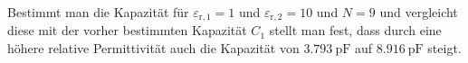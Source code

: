 Bestimmt man die Kapazität für $\varepsilon_{\mathrm{r,1}} = 1$ und $\varepsilon_{\mathrm{r,2}} = 10$ und $N = 9$ und vergleicht diese mit der vorher bestimmten Kapazität $C_1$ stellt man fest, dass durch eine höhere relative Permittivität auch die Kapazität von $\SI{3,793}{\pico\farad}$ auf $\SI{8,916}{\pico\farad}$ steigt.


